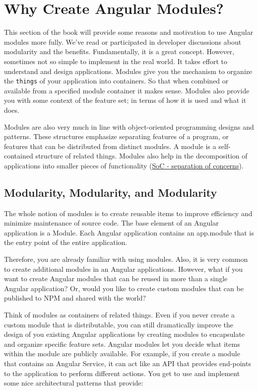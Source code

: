 \documentclass[]{book}
\theoremstyle{definition}
\theoremstyle{definition}
\theoremstyle{definition}
\theoremstyle{remark}
\begin{document}
\chapter{Why Create Angular Modules?}\label{why-create-angular-modules}

This section of the book will provide some reasons and motivation to use
Angular modules more fully. We've read or participated in developer
discussions about modularity and the benefits. Fundamentally, it is a
great concept. However, sometimes not so simple to implement in the real
world. It takes effort to understand and design applications. Modules
give you the mechanism to organize the \texttt{things} of your
application into containers. So that when combined or available from a
specified module container it makes sense. Modules also provide you with
some context of the feature set; in terms of how it is used and what it
does.

Modules are also very much in line with object-oriented programming
designs and patterns. These structures emphasize separating features of
a program, or features that can be distributed from distinct modules. A
module is a self-contained structure of related things. Modules also
help in the decomposition of applications into smaller pieces of
functionality
(\href{https://en.wikipedia.org/wiki/Separation_of_concerns}{SoC -
separation of concerns}).

\section{Modularity, Modularity, and
Modularity}\label{modularity-modularity-and-modularity}

The whole notion of modules is to create reusable items to improve
efficiency and minimize maintenance of source code. The base element of
an Angular application is a Module. Each Angular application contains an
app.module that is the entry point of the entire application.

Therefore, you are already familiar with using modules. Also, it is very
common to create additional modules in an Angular applications. However,
what if you want to create Angular modules that can be reused in more
than a single Angular application? Or, would you like to create custom
modules that can be published to NPM and shared with the world?

Think of modules as containers of related things. Even if you never
create a custom module that is distributable, you can still dramatically
improve the design of you existing Angular applications by creating
modules to encapsulate and organize specific feature sets. Angular
modules let you decide what items within the module are publicly
available. For example, if you create a module that contains an Angular
Service, it can act like an API that provides end-points to the
application to perform different actions. You get to use and implement
some nice architectural patterns that provide:
\end{document}
